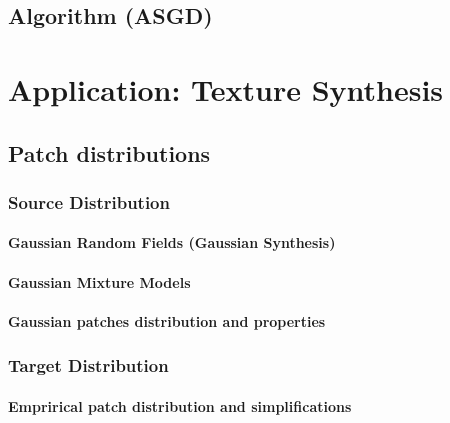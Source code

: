 \documentclass[
     12pt,         %
     a4paper,      %
     BCOR=10mm,     %
     DIV=14,        %
     ]{scrreprt}
\begin{document}


\section{Algorithm (ASGD)} 


\chapter{Application: Texture Synthesis}
\section{Patch distributions}
\subsection{Source Distribution}
\subsubsection{Gaussian Random Fields (Gaussian Synthesis)}
\subsubsection{Gaussian Mixture Models}
\subsubsection{Gaussian patches distribution and properties}


\subsection{Target Distribution}
\subsubsection{Emprirical patch distribution and simplifications}
\end{document}
